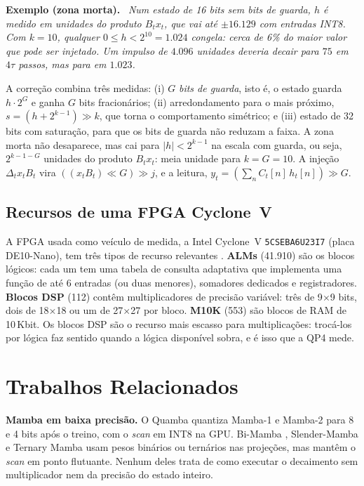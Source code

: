 \documentclass[12pt]{article}
\newenvironment{exemplo}[1]{\par\smallskip\noindent\textbf{Exemplo (#1).}\ \itshape}{\par\smallskip}
\begin{document}
\begin{exemplo}{zona morta}
Num estado de 16 bits sem bits de guarda, $h$ é medido em unidades do produto $B_t x_t$, que vai até $\pm16.129$ com entradas INT8. Com $k = 10$, qualquer $0 \le h < 2^{10} = 1.024$ congela: cerca de 6\% do maior valor que pode ser injetado. Um impulso de $4.096$ unidades deveria decair para $75$ em $4\tau$ passos, mas para em $1.023$.
\end{exemplo}

A correção combina três medidas: (i) $G$ \emph{bits de guarda}, isto é, o estado guarda $h \cdot 2^{G}$ e ganha $G$ bits fracionários; (ii) arredondamento para o mais próximo, $s = (h + 2^{k-1}) \gg k$, que torna o comportamento simétrico; e (iii) estado de 32 bits com saturação, para que os bits de guarda não reduzam a faixa. A zona morta não desaparece, mas cai para $|h| < 2^{k-1}$ na escala com guarda, ou seja, $2^{k-1-G}$ unidades do produto $B_t x_t$: meia unidade para $k = G = 10$. A injeção $\Delta_t x_t B_t$ vira $((x_t B_t) \ll G) \gg j$, e a leitura, $y_t = (\sum_n C_t[n]\,h_t[n]) \gg G$.

\subsection{Recursos de uma FPGA Cyclone~V}
A FPGA usada como veículo de medida, a Intel Cyclone~V \texttt{5CSEBA6U23I7} (placa DE10-Nano), tem três tipos de recurso relevantes \cite{intel_cyclone5_handbook}. \textbf{ALMs} (41.910) são os blocos lógicos: cada um tem uma tabela de consulta adaptativa que implementa uma função de até 6 entradas (ou duas menores), somadores dedicados e registradores. \textbf{Blocos DSP} (112) contêm multiplicadores de precisão variável: três de 9$\times$9 bits, dois de 18$\times$18 ou um de 27$\times$27 por bloco. \textbf{M10K} (553) são blocos de RAM de 10\,Kbit. Os blocos DSP são o recurso mais escasso para multiplicações: trocá-los por lógica faz sentido quando a lógica disponível sobra, e é isso que a QP4 mede.

\section{Trabalhos Relacionados}
\label{sec:rel}

\textbf{Mamba em baixa precisão.} O Quamba \cite{chiang2025quamba,chiang2025quamba2} quantiza Mamba-1 e Mamba-2 para 8 e 4 bits após o treino, com o \emph{scan} em INT8 na GPU. Bi-Mamba \cite{tang2024bimamba}, Slender-Mamba \cite{yu2025slendermamba} e Ternary Mamba \cite{ganesaraja2026ternarymamba} usam pesos binários ou ternários nas projeções, mas mantêm o \emph{scan} em ponto flutuante. Nenhum deles trata de como executar o decaimento sem multiplicador nem da precisão do estado inteiro.
\end{document}
